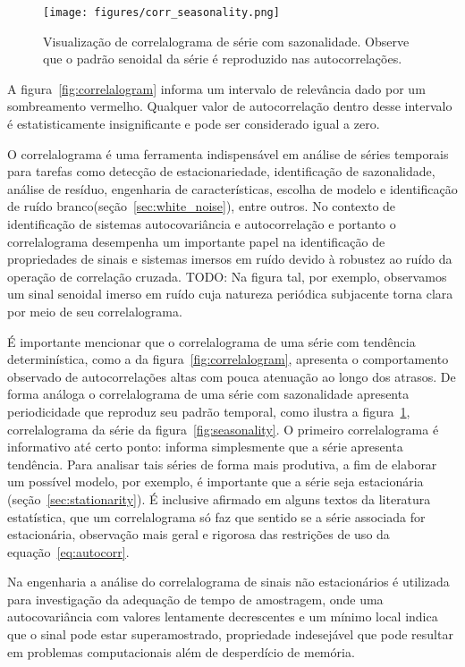 \begin{figure}
    \centering
    \texttt{[image: figures/corr\_seasonality.png]}
    \caption{Visualização de correlalograma de série com sazonalidade.
    Observe que o padrão senoidal da série é reproduzido nas autocorrelações.}
    \label{fig:corr_season}
\end{figure}

A figura~\ref{fig:correlalogram} informa um intervalo de relevância dado por um
sombreamento vermelho. Qualquer valor de autocorrelação dentro desse intervalo
é estatisticamente insignificante e pode ser considerado igual a zero.

O correlalograma é uma ferramenta indispensável em análise de séries temporais
para tarefas como detecção de estacionariedade, identificação de sazonalidade,
análise de resíduo, engenharia de características, escolha de modelo e
identificação de ruído branco(seção~\ref{sec:white_noise}), entre outros. No
contexto de identificação de sistemas autocovariância e autocorrelação e
portanto o correlalograma desempenha um importante papel na identificação de
propriedades de sinais e sistemas imersos em ruído devido à robustez ao ruído
da operação de correlação cruzada\cite{aguirre}. TODO: Na figura tal, por
exemplo, observamos um sinal senoidal imerso em ruído cuja natureza periódica
subjacente torna clara por meio de seu correlalograma.

É importante mencionar que o correlalograma de uma série com tendência
determinística, como a da figura~\ref{fig:correlalogram}, apresenta o
comportamento observado de autocorrelações altas com pouca atenuação ao longo
dos atrasos. De forma análoga o correlalograma de uma série com sazonalidade
apresenta periodicidade que reproduz seu padrão temporal, como ilustra a
figura~\ref{fig:corr_season}, correlalograma da série da
figura~\ref{fig:seasonality}. O primeiro correlalograma é informativo até
certo ponto: informa simplesmente que a série apresenta tendência. Para
analisar tais séries de forma mais produtiva, a fim de elaborar um possível
modelo, por exemplo, é importante que a série seja estacionária
(seção~\ref{sec:stationarity}). É inclusive afirmado em alguns textos da
literatura estatística\cite{chatfield}, que um correlalograma só faz que
sentido se a série associada for estacionária, observação mais geral e rigorosa
das restrições de uso da equação~\ref{eq:autocorr}.

Na engenharia a análise do correlalograma de sinais não estacionários é
utilizada para investigação da adequação de tempo de amostragem, onde uma
autocovariância com valores lentamente decrescentes e um mínimo local indica que
o sinal pode estar superamostrado, propriedade indesejável que pode resultar em
problemas computacionais além de desperdício de memória.

